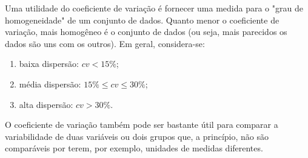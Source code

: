 \documentclass[11pt,fleqn]{book} %
\begin{document}
\vspace{0,3cm}

Uma utilidade do coeficiente de variação é fornecer uma medida para o "grau de homogeneidade" de um conjunto de dados. Quanto menor o coeficiente de variação, mais homogêneo é o conjunto de dados (ou seja, mais parecidos os dados são uns com os outros). Em geral, considera-se: 


\begin{enumerate}[label=\alph*)]
\item baixa dispersão: $cv < 15\%$;
\item média dispersão: $15\% \leq cv \leq 30\%$;
\item alta dispersão: $cv > 30\%$. \\
\end{enumerate}


O coeficiente de variação também pode ser bastante útil para comparar a variabilidade de duas variáveis ou dois grupos que, a princípio, não são comparáveis por terem, por exemplo, unidades de medidas diferentes. \\
\end{document}
